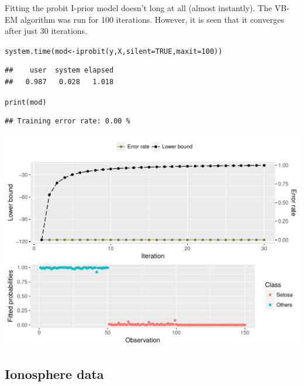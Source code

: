 \documentclass[class=article, crop=false]{standalone}\usepackage[]{graphicx}\usepackage[]{color}
\makeatletter
\def\maxwidth{ %
  \ifdim\Gin@nat@width>\linewidth
    \linewidth
  \else
    \Gin@nat@width
  \fi
}
\newcommand{\hlnum}[1]{\textcolor[rgb]{0.063,0.58,0.627}{#1}}%
\newcommand{\hlstd}[1]{\textcolor[rgb]{0.196,0.196,0.196}{#1}}%
\newcommand{\hlkwb}[1]{\textcolor[rgb]{0.627,0,0.314}{#1}}%
\newcommand{\hlkwc}[1]{\textcolor[rgb]{0,0.631,0.314}{#1}}%
\newcommand{\hlkwd}[1]{\textcolor[rgb]{0.78,0.227,0.412}{#1}}%
\newenvironment{kframe}{%
 \def\at@end@of@kframe{}%
 \ifinner\ifhmode%
  \def\at@end@of@kframe{\end{minipage}}%
  \begin{minipage}{\columnwidth}%
 \fi\fi%
 \def\FrameCommand##1{\hskip\@totalleftmargin \hskip-\fboxsep
 \colorbox{shadecolor}{##1}\hskip-\fboxsep
     \hskip-\linewidth \hskip-\@totalleftmargin \hskip\columnwidth}%
 \MakeFramed {\advance\hsize-\width
   \@totalleftmargin\z@ \linewidth\hsize
   \@setminipage}}%
 {\par\unskip\endMakeFramed%
 \at@end@of@kframe}
\newenvironment{knitrout}{}{} %
\makeatother
\begin{document}
Fitting the probit I-prior model doesn't long at all (almost instantly). The VB-EM algorithm was run for 100 iterations. However, it is seen that it converges after just 30 iterations.

\begin{knitrout}
\color{fgcolor}\begin{kframe}
\begin{alltt}
\hlkwd{system.time}\hlstd{(mod} \hlkwb{<-} \hlkwd{iprobit}\hlstd{(y, X,} \hlkwc{silent} \hlstd{=} \hlnum{TRUE}\hlstd{,} \hlkwc{maxit} \hlstd{=} \hlnum{100}\hlstd{))}
\end{alltt}
\begin{verbatim}
##    user  system elapsed 
##   0.987   0.028   1.018
\end{verbatim}
\begin{alltt}
\hlkwd{print}\hlstd{(mod)}
\end{alltt}
\begin{verbatim}
## Training error rate: 0.00 %
\end{verbatim}
\end{kframe}
\end{knitrout}

\begin{knitrout}
\color{fgcolor}

{\centering \includegraphics[width=\maxwidth]{figure/iris_plot2-1} 

}



\end{knitrout}

\subsection{Ionosphere data}
\end{document}
